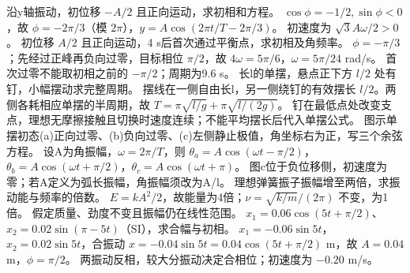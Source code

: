 \problemtext 沿y轴振动，初位移 $-A/2$ 且正向运动，求初相和方程。
\workings $\cos\phi=-1/2,\sin\phi<0$，故 $\phi=-2\pi/3$（模 $2\pi$），$y=A\cos(2\pi t/T-2\pi/3)$。
\crosscheck 初速度为 $\sqrt3 A\omega/2>0$。
\problemtext 初位移 $A/2$ 且正向运动，4 s后首次通过平衡点，求初相及角频率。
\workings $\phi=-\pi/3$；先经过正峰再负向过零，目标相位 $\pi/2$，故 $4\omega=5\pi/6$，$\omega=5\pi/24$ rad/s。
\crosscheck 首次过零不能取初相之前的 $-\pi/2$；周期为9.6 s。
\problemtext 长l的单摆，悬点正下方 $l/2$ 处有钉，小幅摆动求完整周期。
\workings 摆线在一侧自由长l，另一侧绕钉的有效摆长 $l/2$。两侧各耗相应单摆的半周期，故 $T=\pi\sqrt{l/g}+\pi\sqrt{l/(2g)}$。
\crosscheck 钉在最低点处改变支点，理想无摩擦接触且切换时速度连续；不能平均摆长后代入单摆公式。
\problemtext 图示单摆初态(a)正向过零、(b)负向过零、(c)左侧静止极值，角坐标右为正，写三个余弦方程。
\workings 设A为角振幅，$\omega=2\pi/T$，则 $\theta_a=A\cos(\omega t-\pi/2)$，$\theta_b=A\cos(\omega t+\pi/2)$，$\theta_c=A\cos(\omega t+\pi)$。
\crosscheck 图c位于负位移侧，初速度为零；若A定义为弧长振幅，角振幅须改为A/l。
\problemtext 理想弹簧振子振幅增至两倍，求振动能与频率的倍数。
\workings $E=kA^2/2$，故能量为4倍；$\nu=\sqrt{k/m}/(2\pi)$ 不变，为1倍。
\crosscheck 假定质量、劲度不变且振幅仍在线性范围。
\problemtext $x_1=0.06\cos(5t+\pi/2)$、$x_2=0.02\sin(\pi-5t)$（SI），求合幅与初相。
\workings $x_1=-0.06\sin5t$，$x_2=0.02\sin5t$，合振动 $x=-0.04\sin5t=0.04\cos(5t+\pi/2)$ m，故 $A=0.04$ m，$\phi=\pi/2$。
\crosscheck 两振动反相，较大分振动决定合相位；初速度为 $-0.20$ m/s。

